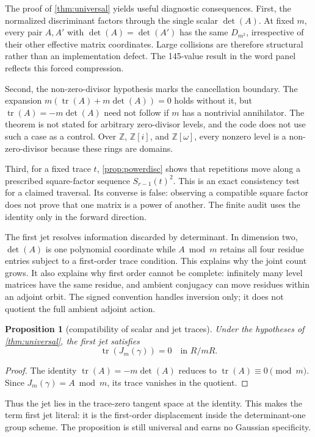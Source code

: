 \documentclass[11pt,a4paper]{article}
\newtheorem{proposition}[theorem]{Proposition}
\theoremstyle{definition}
\theoremstyle{remark}
\newcommand{\tr}{\operatorname{tr}}
\newcommand{\Gauss}{\mathbb{Z}[i]}
\newcommand{\Eis}{\mathbb{Z}[\omega]}
\begin{document}
The proof of \cref{thm:universal} yields useful diagnostic consequences. First, the normalized discriminant factors through the single scalar \(\det(A)\). At fixed \(m\), every pair \(A,A'\) with \(\det(A)=\det(A')\) has the same \(D_{m^2}\), irrespective of their other effective matrix coordinates. Large collisions are therefore structural rather than an implementation defect. The 145-value result in the word panel reflects this forced compression.

Second, the non-zero-divisor hypothesis marks the cancellation boundary. The expansion \(m(\tr(A)+m\det(A))=0\) holds without it, but \(\tr(A)=-m\det(A)\) need not follow if \(m\) has a nontrivial annihilator. The theorem is not stated for arbitrary zero-divisor levels, and the code does not use such a case as a control. Over \(\mathbb Z\), \(\Gauss\), and \(\Eis\), every nonzero level is a non-zero-divisor because these rings are domains.

Third, for a fixed trace \(t\), \cref{prop:powerdisc} shows that repetitions move along a prescribed square-factor sequence \(S_{r-1}(t)^2\). This is an exact consistency test for a claimed traversal. Its converse is false: observing a compatible square factor does not prove that one matrix is a power of another. The finite audit uses the identity only in the forward direction.

The first jet resolves information discarded by determinant. In dimension two, \(\det(A)\) is one polynomial coordinate while \(A\bmod m\) retains all four residue entries subject to a first-order trace condition. This explains why the joint count grows. It also explains why first order cannot be complete: infinitely many level matrices have the same residue, and ambient conjugacy can move residues within an adjoint orbit. The signed convention handles inversion only; it does not quotient the full ambient adjoint action.

\begin{proposition}[compatibility of scalar and jet traces]\label{prop:jettrace}
Under the hypotheses of \cref{thm:universal}, the first jet satisfies
\[
 \tr(J_m(\gamma))=0\quad\text{in }R/mR.
\]
\end{proposition}
\begin{proof}
The identity \(\tr(A)=-m\det(A)\) reduces to \(\tr(A)\equiv0\pmod m\). Since \(J_m(\gamma)=A\bmod m\), its trace vanishes in the quotient.
\end{proof}

Thus the jet lies in the trace-zero tangent space at the identity. This makes the term first jet literal: it is the first-order displacement inside the determinant-one group scheme. The proposition is still universal and earns no Gaussian specificity.
\end{document}
